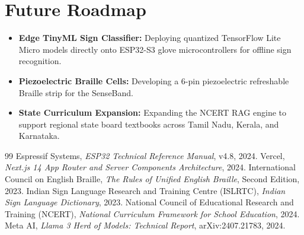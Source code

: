 \documentclass[12pt,a4paper]{report}
\begin{document}
\section{Future Roadmap}
\begin{itemize}
    \item \textbf{Edge TinyML Sign Classifier:} Deploying quantized TensorFlow Lite Micro models directly onto ESP32-S3 glove microcontrollers for offline sign recognition.
    \item \textbf{Piezoelectric Braille Cells:} Developing a 6-pin piezoelectric refreshable Braille strip for the SenseBand.
    \item \textbf{State Curriculum Expansion:} Expanding the NCERT RAG engine to support regional state board textbooks across Tamil Nadu, Kerala, and Karnataka.
\end{itemize}

\clearpage
\begin{thebibliography}{99}
 Espressif Systems, \textit{ESP32 Technical Reference Manual}, v4.8, 2024.
 Vercel, \textit{Next.js 14 App Router and Server Components Architecture}, 2024.
 International Council on English Braille, \textit{The Rules of Unified English Braille}, Second Edition, 2023.
 Indian Sign Language Research and Training Centre (ISLRTC), \textit{Indian Sign Language Dictionary}, 2023.
 National Council of Educational Research and Training (NCERT), \textit{National Curriculum Framework for School Education}, 2024.
 Meta AI, \textit{Llama 3 Herd of Models: Technical Report}, arXiv:2407.21783, 2024.
\end{thebibliography}
\end{document}
